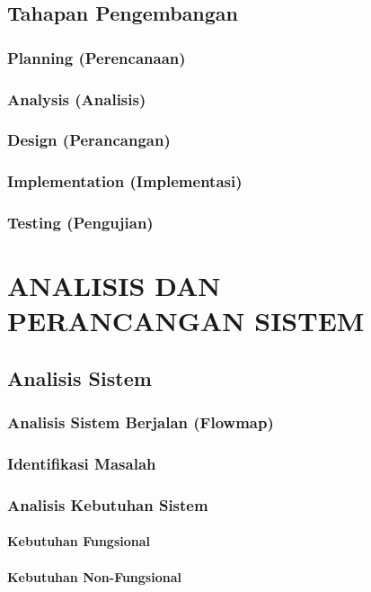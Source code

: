 \documentclass[12pt,a4paper,twoside]{report}
\begin{document}
\section{Tahapan Pengembangan}

\subsection{Planning (Perencanaan)}
\subsection{Analysis (Analisis)}
\subsection{Design (Perancangan)}
\subsection{Implementation (Implementasi)}
\subsection{Testing (Pengujian)}

\chapter{ANALISIS DAN PERANCANGAN SISTEM}

\section{Analisis Sistem}

\subsection{Analisis Sistem Berjalan (Flowmap)}
\subsection{Identifikasi Masalah}
\subsection{Analisis Kebutuhan Sistem}

\subsubsection{Kebutuhan Fungsional}
\subsubsection{Kebutuhan Non-Fungsional}
\end{document}
